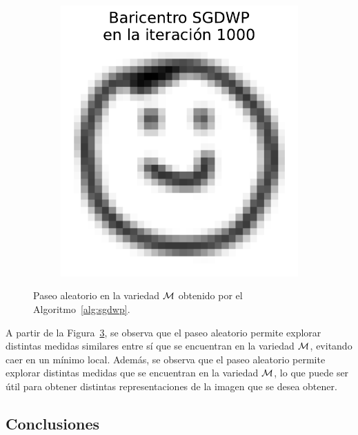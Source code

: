 \begin{figure}[H]
\begin{subfigure}[b]{0.17\textwidth}
        \label{fig:bar-SGDWP-random-walk-iter-09}
    \end{subfigure}
    \hfill
    \begin{subfigure}[b]{0.17\textwidth}
        \centering
        \includegraphics[width=\textwidth]{img/sgdwp-rw/bar-SGDWP-random-walk-iter-10.pdf}
        \label{fig:bar-SGDWP-random-walk-iter-10}
    \end{subfigure}
    \caption{Paseo aleatorio en la variedad $\operatorname{\mathcal{M}}$ obtenido por el Algoritmo~\ref{alg:sgdwp}.}
    \label{fig:bar-SGDWP-random-walk}
\end{figure}

A partir de la Figura~\ref{fig:bar-SGDWP-random-walk}, se observa que el paseo aleatorio permite explorar distintas medidas similares entre sí que se encuentran en la variedad $\operatorname{\mathcal{M}}$, evitando caer en un mínimo local. Además, se observa que el paseo aleatorio permite explorar distintas medidas que se encuentran en la variedad $\operatorname{\mathcal{M}}$, lo que puede ser útil para obtener distintas representaciones de la imagen que se desea obtener.

\subsection{Conclusiones}\label{ssec:sgdwp-conclusiones}  %

